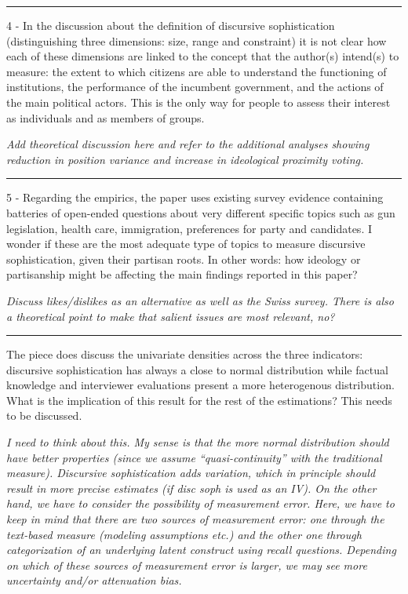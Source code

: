 
\rule{\linewidth}{.01cm}

4 - In the discussion about the definition of discursive sophistication (distinguishing three dimensions: size, range and constraint) it is not clear how each of these dimensions are linked to the concept that the author(s) intend(s) to measure: the extent to which citizens are able to understand the functioning of institutions, the performance of the incumbent government, and the actions of the main political actors. This is the only way for people to assess their interest as individuals and as members of groups.

\textit{Add theoretical discussion here and refer to the additional analyses showing reduction in position variance and increase in ideological proximity voting.}


\rule{\linewidth}{.01cm}

5 - Regarding the empirics, the paper uses existing survey evidence containing batteries of open-ended questions about very different specific topics such as gun legislation, health care, immigration, preferences for party and candidates. I wonder if these are the most adequate type of topics to measure discursive sophistication, given their partisan roots. In other words: how ideology or partisanship might be affecting the main findings reported in this paper?

\textit{Discuss likes/dislikes as an alternative as well as the Swiss survey. There is also a theoretical point to make that salient issues are most relevant, no?}


\rule{\linewidth}{.01cm}

The piece does discuss the univariate densities across the three indicators: discursive sophistication has always a close to normal distribution while factual knowledge and interviewer evaluations present a more heterogenous distribution. What is the implication of this result for the rest of the estimations? This needs to be discussed.

\textit{I need to think about this. My sense is that the more normal distribution should have better properties (since we assume ``quasi-continuity'' with the traditional measure). Discursive sophistication adds variation, which in principle should result in more precise estimates (if disc soph is used as an IV). On the other hand, we have to consider the possibility of measurement error. Here, we have to keep in mind that there are two sources of measurement error: one through the text-based measure (modeling assumptions etc.) and the other one through categorization of an underlying latent construct using recall questions. Depending on which of these sources of measurement error is larger, we may see more uncertainty and/or attenuation bias.}

